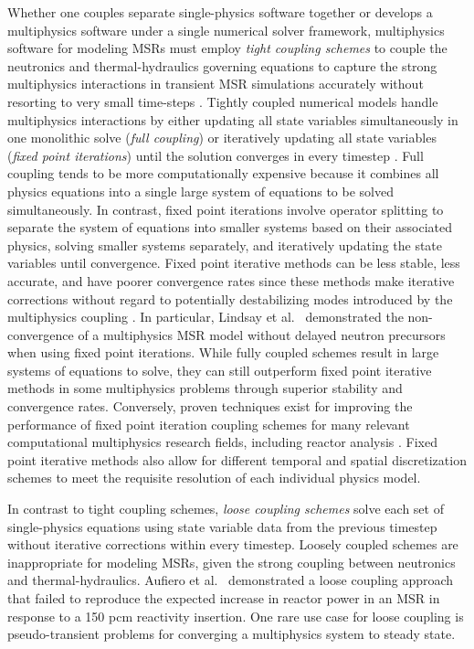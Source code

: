 Whether one couples separate single-physics software together or develops a multiphysics software
under a single numerical solver framework, multiphysics software for modeling \glspl{MSR} must
employ \textit{tight coupling schemes} to couple the neutronics and thermal-hydraulics governing
equations to capture the strong multiphysics interactions in transient \gls{MSR} simulations
accurately without resorting to very small time-steps \cite{aufiero_development_2014}. Tightly
coupled numerical models handle multiphysics interactions by either updating all state
variables simultaneously in one monolithic solve (\textit{full coupling}) or
iteratively updating all state variables (\textit{fixed point iterations})
until the solution converges in every timestep \cite{keyes_multiphysics_2013}.
Full coupling tends to be more computationally expensive because it combines
all physics equations into a single large system of equations to be solved
simultaneously. In contrast, fixed point iterations involve operator splitting to
separate the system of equations into smaller systems based on their associated
physics, solving smaller systems separately, and iteratively updating the state
variables until convergence. Fixed point iterative methods can be less
stable, less accurate, and have poorer
convergence rates since these methods make iterative corrections
without regard to potentially destabilizing modes introduced by the
multiphysics coupling \cite{keyes_multiphysics_2013}. In particular, Lindsay et al.\
\cite{lindsay_introduction_2018} demonstrated the non-convergence of a multiphysics \gls{MSR}
model without delayed neutron precursors when using fixed point iterations. While fully coupled
schemes result in large systems of equations to solve, they can still outperform fixed point
iterative methods in some multiphysics problems through superior stability and convergence rates.
Conversely, proven techniques exist for improving the performance of fixed point iteration coupling
schemes for many relevant computational multiphysics research fields, including reactor analysis
\cite{ragusa_consistent_2009}. Fixed point iterative methods also allow for different temporal and
spatial discretization schemes to meet the requisite resolution of each
individual physics model.

In contrast to tight coupling schemes, \textit{loose coupling schemes}
solve each set of single-physics equations using state variable
data from the previous timestep without iterative corrections within every
timestep. Loosely coupled schemes are inappropriate for modeling \glspl{MSR},
given the strong coupling between neutronics and thermal-hydraulics.
Aufiero et al.\ \cite{aufiero_development_2014} demonstrated a loose coupling
approach that failed to reproduce the expected increase in reactor power
in an \gls{MSR} in response to a 150 pcm reactivity insertion. One rare use case for loose
coupling is pseudo-transient problems for converging a multiphysics system to steady state.

